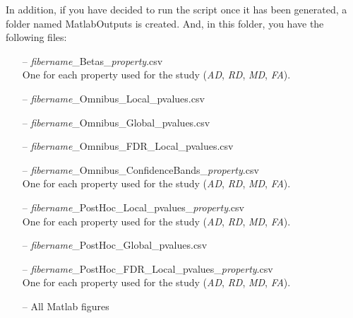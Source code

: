 \documentclass[fadttsterUserGuide_use]{subfiles}
\begin{document}
	In addition, if you have decided to run the script once it has been generated, a folder named MatlabOutputs is created. And, in this folder, you have the following files:
	\begin{itemize}
		\item[--] \textit{fibername}\_Betas\_\textit{property}.csv\\
		One for each property used for the study (\textit{AD}, \textit{RD}, \textit{MD}, \textit{FA}).
		\item[--] \textit{fibername}\_Omnibus\_Local\_pvalues.csv
		\item[--] \textit{fibername}\_Omnibus\_Global\_pvalues.csv
		\item[--] \textit{fibername}\_Omnibus\_FDR\_Local\_pvalues.csv
		\item[--] \textit{fibername}\_Omnibus\_ConfidenceBands\_\textit{property}.csv\\
		One for each property used for the study (\textit{AD}, \textit{RD}, \textit{MD}, \textit{FA}).
		\item[--] \textit{fibername}\_PostHoc\_Local\_pvalues\_\textit{property}.csv\\
		One for each property used for the study (\textit{AD}, \textit{RD}, \textit{MD}, \textit{FA}).
		\item[--] \textit{fibername}\_PostHoc\_Global\_pvalues.csv
		\item[--] \textit{fibername}\_PostHoc\_FDR\_Local\_pvalues\_\textit{property}.csv\\
		One for each property used for the study (\textit{AD}, \textit{RD}, \textit{MD}, \textit{FA}).
		\item[--] All Matlab figures
	\end{itemize}
\end{document}
